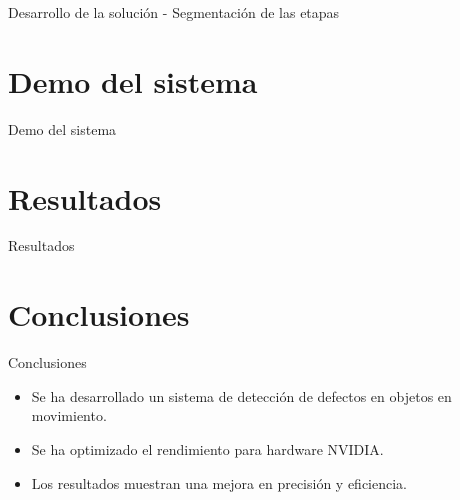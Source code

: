 \documentclass[spanish]{beamer}
\begin{document}
\begin{frame}{Desarrollo de la solución - Segmentación de las etapas}
\end{frame}

\section{Demo del sistema}
\begin{frame}{Demo del sistema}
\end{frame}

\section{Resultados}
\begin{frame}{Resultados}
\end{frame}

\section{Conclusiones}
\begin{frame}{Conclusiones}
    \begin{itemize}
        \item Se ha desarrollado un sistema de detección de defectos en objetos en movimiento.
        \item Se ha optimizado el rendimiento para hardware NVIDIA.
        \item Los resultados muestran una mejora en precisión y eficiencia.
    \end{itemize}
\end{frame}
\end{document}
